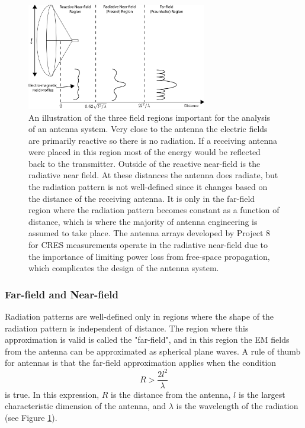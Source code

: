 \begin{figure}[htbp]
    \centering
    \includegraphics[width=0.7\textwidth]{figs/Chapter-5/230421_field_regions.png}
    \caption{An illustration of the three field regions important for the analysis of an antenna system. Very close to the antenna the electric fields are primarily reactive so there is no radiation. If a receiving antenna were placed in this region most of the energy would be reflected back to the transmitter. Outside of the reactive near-field is the radiative near field. At these distances the antenna does radiate, but the radiation pattern is not well-defined since it changes based on the distance of the receiving antenna. It is only in the far-field region where the radiation pattern becomes constant as a function of distance, which is where the majority of antenna engineering is assumed to take place. The antenna arrays developed by Project 8 for CRES measurements operate in the radiative near-field due to the importance of limiting power loss from free-space propagation, which complicates the design of the antenna system.}
    \label{fig:field-regions}
\end{figure}

\subsubsection{Far-field and Near-field}
Radiation patterns are well-defined only in regions where the shape of the radiation pattern is independent of distance. The region where this approximation is valid is called the "far-field", and in this region the EM fields from the antenna can be approximated as spherical plane waves. A rule of thumb for antennas is that the far-field approximation applies when the condition
\begin{equation}
    R > \frac{2l^2}{\lambda}
\end{equation}
is true. In this expression, $R$ is the distance from the antenna, $l$ is the largest characteristic dimension of the antenna, and $\lambda$ is the wavelength of the radiation (see Figure \ref{fig:field-regions}). 

